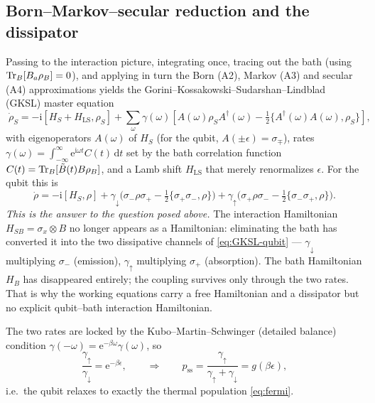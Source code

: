 \documentclass[11pt,a4paper]{article}
\theoremstyle{plain}
\theoremstyle{definition}
\theoremstyle{remark}
\newcommand{\ee}{\mathrm{e}}
\newcommand{\ii}{\mathrm{i}}
\renewcommand{\dd}{\mathrm{d}}
\begin{document}
\subsection{Born--Markov--secular reduction and the dissipator}
\label{sec:BMS}
Passing to the interaction picture, integrating once, tracing out the
bath (using $\Tr_B[B_a\rho_B]=0$), and applying in turn the Born (A2),
Markov (A3) and secular (A4) approximations yields the
Gorini--Kossakowski--Sudarshan--Lindblad (GKSL) master equation
\begin{equation}
\boxed{\;
\dot\rho_S = -\ii[H_S+H_{\mathrm{LS}},\rho_S]
+ \sum_\omega \gamma(\omega)\!\left[A(\omega)\rho_S A^\dagger(\omega)
-\tfrac12\{A^\dagger(\omega)A(\omega),\rho_S\}\right],
\;}
\label{eq:GKSL}
\end{equation}
with eigenoperators $A(\omega)$ of $H_S$ (for the qubit,
$A(\pm\epsilon)=\sigma_\mp$), rates
$\gamma(\omega)=\int_{-\infty}^\infty \ee^{\ii\omega t}C(t)\,\dd t$ set by
the bath correlation function $C(t)=\Tr_B[\tilde B(t)B\rho_B]$, and a Lamb
shift $H_{\mathrm{LS}}$ that merely renormalizes $\epsilon$. For the qubit
this is
\begin{equation}
\dot\rho = -\ii[H_S,\rho]
+\gamma_\downarrow\big(\sigma_-\rho\sigma_+-\tfrac12\{\sigma_+\sigma_-,\rho\}\big)
+\gamma_\uparrow\big(\sigma_+\rho\sigma_--\tfrac12\{\sigma_-\sigma_+,\rho\}\big).
\label{eq:GKSL-qubit}
\end{equation}
\emph{This is the answer to the question posed above.} The interaction
Hamiltonian $H_{SB}=\sigma_x\otimes B$ no longer appears as a
Hamiltonian: eliminating the bath has converted it into the two
dissipative channels of \eqref{eq:GKSL-qubit} --- $\gamma_\downarrow$
multiplying $\sigma_-$ (emission), $\gamma_\uparrow$ multiplying
$\sigma_+$ (absorption). The bath Hamiltonian $H_B$ has disappeared
entirely; the coupling survives only through the two rates. That is why
the working equations carry a free Hamiltonian and a dissipator but no
explicit qubit--bath interaction Hamiltonian.

The two rates are locked by the Kubo--Martin--Schwinger (detailed
balance) condition $\gamma(-\omega)=\ee^{-\beta\omega}\gamma(\omega)$, so
\begin{equation}
\frac{\gamma_\uparrow}{\gamma_\downarrow}=\ee^{-\beta\epsilon},
\qquad\Rightarrow\qquad
p_{\mathrm{ss}}=\frac{\gamma_\uparrow}{\gamma_\uparrow+\gamma_\downarrow}
= g(\beta\epsilon),
\label{eq:db-rates}
\end{equation}
i.e.\ the qubit relaxes to exactly the thermal population \eqref{eq:fermi}.
\end{document}
